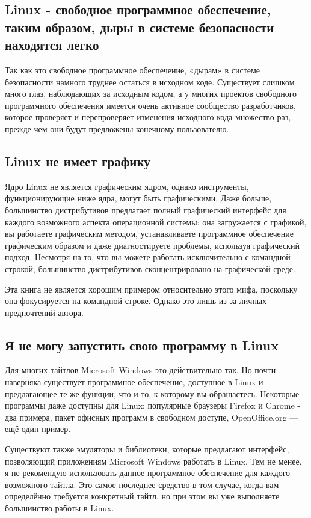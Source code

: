 \documentclass[10pt]{book}
\begin{document}
\subsection{Linux - свободное программное обеспечение, таким образом, дыры в системе безопасности находятся легко}

Так как это свободное программное обеспечение, «дырам» в системе безопасности намного труднее остаться в исходном коде. Существует слишком много глаз, наблюдающих за исходным кодом, а у многих проектов свободного программного обеспечения имеется очень активное сообщество разработчиков, которое проверяет и перепроверяет изменения исходного кода множество раз, прежде чем они будут предложены конечному пользователю.

\subsection{Linux не имеет графику}

Ядро Linux не является графическим ядром, однако инструменты, функционирующие ниже ядра, могут быть графическими. Даже больше, большинство дистрибутивов предлагает полный графический интерфейс для каждого возможного аспекта операционной системы: она загружается с графикой, вы работаете графическим методом, устанавливаете программное обеспечение графическим образом и даже диагностируете проблемы, используя графический подход. Несмотря на то, что вы можете работать исключительно с командной строкой, большинство дистрибутивов сконцентрировано на графической среде.

Эта книга не является хорошим примером относительно этого мифа, поскольку она фокусируется на командной строке. Однако это лишь из-за личных предпочтений автора.

\subsection{Я не могу запустить свою программу в Linux}

Для многих тайтлов Microsoft Windows это действительно так. Но почти наверняка существует программное обеспечение, доступное в Linux и предлагающее те же функции, что и то, к которому вы обращаетесь. Некоторые программы даже доступны для Linux: популярные браузеры Firefox и Chrome - два примера, пакет офисных программ в свободном доступе, OpenOffice.org — ещё один пример.

Существуют также эмуляторы и библиотеки, которые предлагают интерфейс, позволяющий приложениям Microsoft Windows работать в Linux. Тем не менее, я не рекомендую использовать данное программное обеспечение для каждого возможного тайтла. Это самое последнее средство в том случае, когда вам определённо требуется конкретный тайтл, но при этом вы уже выполняете большинство работы в Linux.
\end{document}
